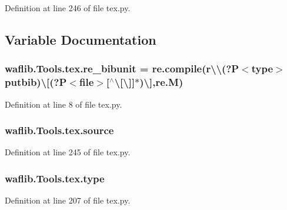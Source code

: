 Definition at line 246 of file tex.\+py.



\subsection{Variable Documentation}
\subsubsection[{\texorpdfstring{re\+\_\+bibunit}{re_bibunit}}]{\setlength{\rightskip}{0pt plus 5cm}waflib.\+Tools.\+tex.\+re\+\_\+bibunit = re.\+compile(r\textquotesingle{}\textbackslash{}\textbackslash{}(?P$<${\bf type}$>$putbib)\textbackslash{}\mbox{[}(?P$<$file$>$\mbox{[}$^\wedge$\textbackslash{}\mbox{[}\textbackslash{}\mbox{]}\mbox{]}$\ast$)\textbackslash{}\mbox{]}\textquotesingle{},{\bf re.\+M})}\hypertarget{namespacewaflib_1_1_tools_1_1tex_a9ea80e6d61d3c229a41e970979b3e35c}{}\label{namespacewaflib_1_1_tools_1_1tex_a9ea80e6d61d3c229a41e970979b3e35c}


Definition at line 8 of file tex.\+py.

\subsubsection[{\texorpdfstring{source}{source}}]{\setlength{\rightskip}{0pt plus 5cm}waflib.\+Tools.\+tex.\+source}\hypertarget{namespacewaflib_1_1_tools_1_1tex_a31a6a1fbec6ca2e256ca4db01feb1d69}{}\label{namespacewaflib_1_1_tools_1_1tex_a31a6a1fbec6ca2e256ca4db01feb1d69}


Definition at line 245 of file tex.\+py.

\subsubsection[{\texorpdfstring{type}{type}}]{\setlength{\rightskip}{0pt plus 5cm}waflib.\+Tools.\+tex.\+type}\hypertarget{namespacewaflib_1_1_tools_1_1tex_a7638d43e3ce55594540ea118202a9a40}{}\label{namespacewaflib_1_1_tools_1_1tex_a7638d43e3ce55594540ea118202a9a40}


Definition at line 207 of file tex.\+py.

